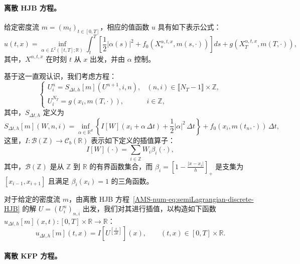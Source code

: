 \documentclass{amsproc}
\theoremstyle{definition}
\theoremstyle{remark}
\numberwithin{equation}{section}
\newcommand{\RR}{{\mathbb R}}
\newcommand{\ZZ}{{\mathbb Z}}
\newcommand{\cB}{{\mathcal B}}
\newcommand{\ctrl}{\alpha}
\begin{document}
\paragraph{\textbf{离散 HJB 方程。}} 给定密度流 $m = (m_t)_{t\in[0,T]}$，相应的值函数 $u$ 具有如下表示公式：
$$
	u(t,x) = \inf_{\ctrl \in L^2([t,T]; \RR)} \int_t^T \left[ \frac{1}{2}|\ctrl(s)|^2 + f_0(X^{\ctrl,t,x}_s, m(s,\cdot))\right] ds + g(X^{\ctrl,t,x}_T, m(T,\cdot)),
$$
其中，$X^{\ctrl,t,x}$ 在时刻 $t$ 从 $x$ 出发，并由 $\ctrl$ 控制。



基于这一直观认识，我们考虑方程：
\begin{equation}
\label{AMS-num-eq:semiLagrangian-discrete-HJB}
\begin{cases}
	U^n_i = S_{\Delta t, h}[m](U^{n+1}, i, n), & (n,i) \in \llbracket N_T-1 \rrbracket \times  \ZZ,
	\\
	U^{N_T}_i = g(x_i, m(T, \cdot)), & i \in \ZZ,
\end{cases}
\end{equation}
其中，$S_{\Delta t, h}$ 定义为
\begin{equation}
\label{AMS-num-eq:semiLagrangian-S_Deltat-h}
	S_{\Delta t, h}[m](W, n, i) = \inf_{\ctrl \in \RR^d} \left\{ I[W](x_i + \ctrl \, \Delta t) + \frac{1}{2} |\ctrl|^2 \, \Delta t  \right\} + f_0(x_i, m(t_n, \cdot)) \, \Delta t ,
\end{equation}
这里，$I: \cB(\ZZ) \to \mathcal{C}_b(\RR)$ 表示如下定义的插值算子：
$$ 
	I[W](\cdot) = \sum_{i \in \ZZ} W_i \beta_i(\cdot), 
$$
其中，$\cB(\ZZ)$ 是从 $\ZZ$ 到 $\RR$ 的有界函数集合，而 $\beta_i =  \left[ 1 - \frac{|x - x_i|}{h} \right]_+$ 是支集为 $[x_{i-1}, x_{i+1}]$ 且满足 $\beta_i(x_i)=1$ 的三角函数。

对于给定的密度流 $m$，由离散 HJB 方程~\eqref{AMS-num-eq:semiLagrangian-discrete-HJB} 的解 $U = (U^n_i)_{n,i}$ 出发，我们对其进行插值，以构造如下函数 $u_{\Delta t, h}[m](x,t):  [0,T] \times \RR \to \RR$：
$$
	u_{\Delta t, h}[m](t,x) = I[U^{[\frac{t}{\Delta t}]}](x), \qquad (t,x) \in [0,T] \times \RR.
$$

\paragraph{\textbf{离散 KFP 方程。}}
\end{document}
